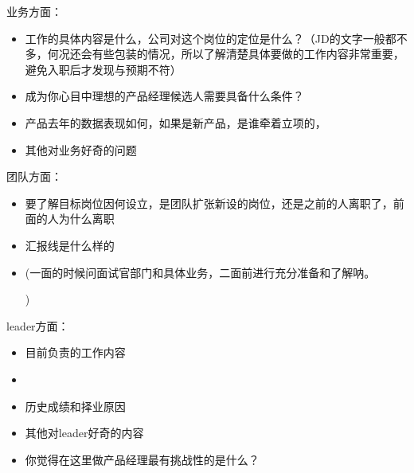 \documentclass[letterpaper,10pt,english]{sphinxmanual}
\begin{document}
业务方面：%
\begin{footnote}[873]\sphinxAtStartFootnote
{}
%
\end{footnote}
\begin{itemize}
\item {} 
工作的具体内容是什么，公司对这个岗位的定位是什么？（JD的文字一般都不多，何况还会有些包装的情况，所以了解清楚具体要做的工作内容非常重要，避免入职后才发现与预期不符）

\item {} 
成为你心目中理想的产品经理候选人需要具备什么条件？

\item {} 
产品去年的数据表现如何，如果是新产品，是谁牵着立项的，

\item {} 
其他对业务好奇的问题

\end{itemize}

团队方面：
\begin{itemize}
\item {} 
要了解目标岗位因何设立，是团队扩张新设的岗位，还是之前的人离职了，前面的人为什么离职

\item {} 
汇报线是什么样的

\item {} 
(一面的时候问面试官部门和具体业务，二面前进行充分准备和了解呐。%
\begin{footnote}[874]\sphinxAtStartFootnote
{}
%
\end{footnote})

\end{itemize}

leader方面：
\begin{itemize}
\item {} 
目前负责的工作内容

\item {} 

\item {} 
历史成绩和择业原因

\item {} 
其他对leader好奇的内容

\item {} 
你觉得在这里做产品经理最有挑战性的是什么？%
\begin{footnote}[875]\sphinxAtStartFootnote
{}
%
\end{footnote}

\end{itemize}
\end{document}

